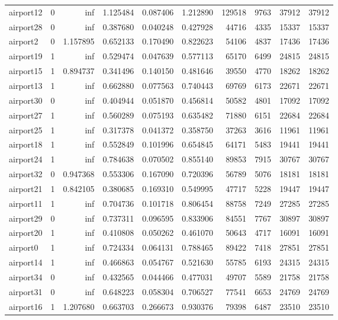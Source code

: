\begin{longtable}{|l|r|r|r|r|r|r|r|r|r|}
airport12 & 0 & inf & 1.125484 & 0.087406 & 1.212890 & 129518 & 9763 & 37912 & 37912 \\
airport28 & 0 & inf & 0.387680 & 0.040248 & 0.427928 & 44716 & 4335 & 15337 & 15337 \\
airport2 & 0 & 1.157895 & 0.652133 & 0.170490 & 0.822623 & 54106 & 4837 & 17436 & 17436 \\
airport19 & 1 & inf & 0.529474 & 0.047639 & 0.577113 & 65170 & 6499 & 24815 & 24815 \\
airport15 & 1 & 0.894737 & 0.341496 & 0.140150 & 0.481646 & 39550 & 4770 & 18262 & 18262 \\
airport13 & 1 & inf & 0.662880 & 0.077563 & 0.740443 & 69769 & 6173 & 22671 & 22671 \\
airport30 & 0 & inf & 0.404944 & 0.051870 & 0.456814 & 50582 & 4801 & 17092 & 17092 \\
airport27 & 1 & inf & 0.560289 & 0.075193 & 0.635482 & 71880 & 6151 & 22684 & 22684 \\
airport25 & 1 & inf & 0.317378 & 0.041372 & 0.358750 & 37263 & 3616 & 11961 & 11961 \\
airport18 & 1 & inf & 0.552849 & 0.101996 & 0.654845 & 64171 & 5483 & 19441 & 19441 \\
airport24 & 1 & inf & 0.784638 & 0.070502 & 0.855140 & 89853 & 7915 & 30767 & 30767 \\
airport32 & 0 & 0.947368 & 0.553306 & 0.167090 & 0.720396 & 56789 & 5076 & 18181 & 18181 \\
airport21 & 1 & 0.842105 & 0.380685 & 0.169310 & 0.549995 & 47717 & 5228 & 19447 & 19447 \\
airport11 & 1 & inf & 0.704736 & 0.101718 & 0.806454 & 88758 & 7249 & 27285 & 27285 \\
airport29 & 0 & inf & 0.737311 & 0.096595 & 0.833906 & 84551 & 7767 & 30897 & 30897 \\
airport20 & 1 & inf & 0.410808 & 0.050262 & 0.461070 & 50643 & 4717 & 16091 & 16091 \\
airport0 & 1 & inf & 0.724334 & 0.064131 & 0.788465 & 89422 & 7418 & 27851 & 27851 \\
airport14 & 1 & inf & 0.466863 & 0.054767 & 0.521630 & 55785 & 6193 & 24315 & 24315 \\
airport34 & 0 & inf & 0.432565 & 0.044466 & 0.477031 & 49707 & 5589 & 21758 & 21758 \\
airport31 & 0 & inf & 0.648223 & 0.058304 & 0.706527 & 77541 & 6653 & 24769 & 24769 \\
airport16 & 1 & 1.207680 & 0.663703 & 0.266673 & 0.930376 & 79398 & 6487 & 23510 & 23510 \\

\end{longtable}
